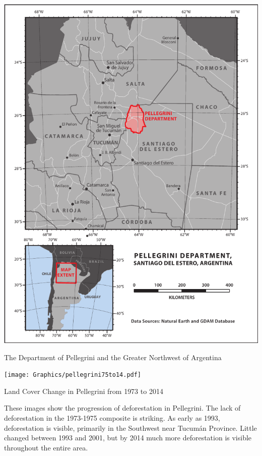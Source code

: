 \begin{ssfigure}
  \centering
  \includegraphics[width=\textwidth]{Graphics/argentinaOverview.pdf}
  \caption{The Department of Pellegrini and the Greater Northwest of Argentina}
  \label{map:argentinaOverview}
\end{ssfigure}

\begin{ssfigure}
  \centering
  \texttt{[image: Graphics/pellegrini75to14.pdf]}
  \caption{Land Cover Change in Pellegrini from 1973 to 2014}
  \label{map:pellegriniCoverChange}
  \medskip
  \small
  These images show the progression of deforestation in Pellegrini. The lack of deforestation in the 1973-1975 composite is striking. As early as 1993, deforestation is visible, primarily in the Southwest near Tucumán Province. Little changed between 1993 and 2001, but by 2014 much more deforestation is visible throughout the entire area.
\end{ssfigure}

